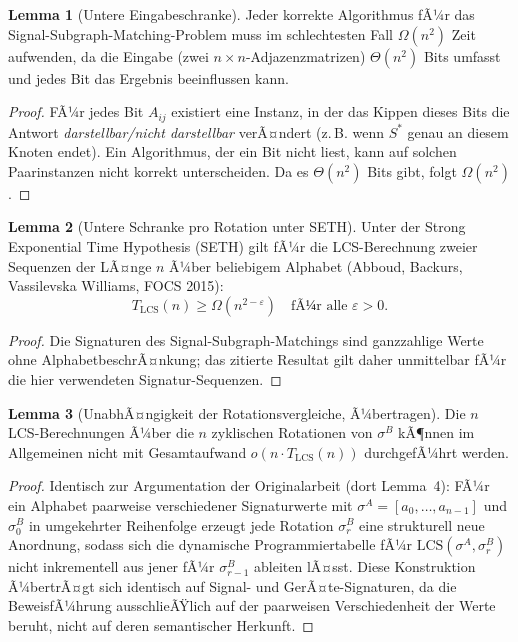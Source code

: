 ﻿\documentclass[a4paper,12pt]{article}
\theoremstyle{definition}
\newtheorem{lemma}{Lemma}
\begin{document}
\begin{lemma}[Untere Eingabeschranke]
\label{lem:eingabe}
	Jeder korrekte Algorithmus fÃ¼r das Signal-Subgraph-Matching-Problem muss im schlechtesten Fall $\Omega(n^2)$ Zeit aufwenden, da die Eingabe (zwei $n \times n$-Adjazenzmatrizen) $\Theta(n^2)$ Bits umfasst und jedes Bit das Ergebnis beeinflussen kann.
\end{lemma}
\begin{proof}
	FÃ¼r jedes Bit $A_{ij}$ existiert eine Instanz, in der das Kippen dieses Bits die Antwort \emph{darstellbar/nicht darstellbar} verÃ¤ndert (z.\,B. wenn $S^\ast$ genau an diesem Knoten endet). Ein Algorithmus, der ein Bit nicht liest, kann auf solchen Paarinstanzen nicht korrekt unterscheiden. Da es $\Theta(n^2)$ Bits gibt, folgt $\Omega(n^2)$.
\end{proof}

\begin{lemma}[Untere Schranke pro Rotation unter SETH]
\label{lem:lcs}
	Unter der Strong Exponential Time Hypothesis (SETH) gilt fÃ¼r die LCS-Berechnung zweier Sequenzen der LÃ¤nge $n$ Ã¼ber beliebigem Alphabet (Abboud, Backurs, Vassilevska Williams, FOCS 2015):
	\[
	T_{\mathrm{LCS}}(n) \geq \Omega(n^{2-\varepsilon}) \quad \text{fÃ¼r alle } \varepsilon > 0.
	\]
\end{lemma}
\begin{proof}
	Die Signaturen des Signal-Subgraph-Matchings sind ganzzahlige Werte ohne AlphabetbeschrÃ¤nkung; das zitierte Resultat gilt daher unmittelbar fÃ¼r die hier verwendeten Signatur-Sequenzen.
\end{proof}

\begin{lemma}[UnabhÃ¤ngigkeit der Rotationsvergleiche, Ã¼bertragen]
\label{lem:unabhaengigkeit}
	Die $n$ LCS-Berechnungen Ã¼ber die $n$ zyklischen Rotationen von $\sigma^B$ kÃ¶nnen im Allgemeinen nicht mit Gesamtaufwand $o(n \cdot T_{\mathrm{LCS}}(n))$ durchgefÃ¼hrt werden.
\end{lemma}
\begin{proof}
	Identisch zur Argumentation der Originalarbeit (dort Lemma~4): FÃ¼r ein Alphabet paarweise verschiedener Signaturwerte mit $\sigma^A = [a_0,\ldots,a_{n-1}]$ und $\sigma^B_0$ in umgekehrter Reihenfolge erzeugt jede Rotation $\sigma^B_r$ eine strukturell neue Anordnung, sodass sich die dynamische Programmiertabelle fÃ¼r $\mathrm{LCS}(\sigma^A, \sigma^B_r)$ nicht inkrementell aus jener fÃ¼r $\sigma^B_{r-1}$ ableiten lÃ¤sst. Diese Konstruktion Ã¼bertrÃ¤gt sich identisch auf Signal- und GerÃ¤te-Signaturen, da die BeweisfÃ¼hrung ausschlieÃŸlich auf der paarweisen Verschiedenheit der Werte beruht, nicht auf deren semantischer Herkunft.
\end{proof}
\end{document}
